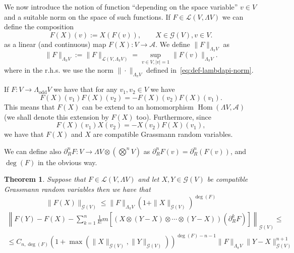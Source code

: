 \documentclass[11pt]{article}
\newcommand{\assign}{:=}
\newcommand{\tmop}[1]{\ensuremath{\operatorname{#1}}}
\newtheorem{theorem}{Theorem}
\begin{document}
We now introduce the notion of function ``depending on the space variable'' $v
\in V$ and a suitable norm on the space of such functions. If $F \in
\mathcal{L} (V, \Lambda V)$ we can define the composition
\[ F (X) (v) \assign X (F (v)), \qquad X \in \mathcal{G} (V), v \in V. \]
as a linear (and continuous) map $F (X) : V \rightarrow \mathcal{A}$. We
define $\| F \|_{\Lambda_{\pi} V\mathcal{}}$ as
\begin{equation}
  \| F \|_{\Lambda_{\pi} V\mathcal{}} \assign \| F \|_{\mathcal{L} (V,
  \Lambda_{\pi} V)} = \sup_{v \in V, | v | = 1} \| F (v) \|_{\Lambda_{\pi} V}
  . \label{eq:normfunction}
\end{equation}
where in the r.h.s. we use the norm $\| \cdot \|_{\Lambda_{\pi} V}$ defined
in~{\eqref{eq:def-lambdapi-norm}}.

\begin{remark}
  If $F : V \rightarrow \Lambda_{\tmop{odd}} V$ we have that for any $v_1, v_2
  \in V$ we have
  \[ F (X) (v_1) F (X) (v_2) = - F (X) (v_2) F (X) (v_1) . \]
  This means that $F (X)$ can be extend to an homomorphism $\tmop{Hom}
  (\Lambda V, \mathcal{A})$ (we shall denote this extension by $F (X)$ too).
  Furthermore, since
  \[ F (X) (v_1) X (v_2) = - X (v_2) F (X) (v_1), \]
  we have that $F (X)$ and $X$ are compatible Grassmann random variables.
\end{remark}

We can define also $\partial_R^n F : V \rightarrow \Lambda V \otimes \left(
\bigotimes^n V \right)$ as $\partial_R^n F (v) = \partial^n_R (F (v))$, and
$\deg (F)$ in the obvious way.

\begin{theorem}
  \label{theorem_function2}Suppose that $F \in \mathcal{L} (V, \Lambda V)$ and
  let $X, Y \in \mathcal{G} (V)$ be compatible Grassmann random variables then
  we have that
  \[ \| F (X) \|_{\mathcal{G} (V)} \leqslant \| F \|_{\Lambda_{\pi} V} (1 +
     \| X \|_{\mathcal{G} (V)})^{\deg (F)} \]
  \[ \begin{array}{c}
       \left\| F (Y) - F (X) - \sum_{k = 1}^n \frac{1}{k!} m [(X \otimes (Y -
       X) \otimes \cdots \otimes (Y - X)) (\partial_R^k F)]
       \right\|_{\mathcal{G} (V)} \leqslant\\
       \leqslant C_{n, \deg (F)} (1 + \max (\| X \|_{\mathcal{G} (V)}, \| Y
       \|_{\mathcal{G} (V)}))^{\deg (F) - n - 1} \| F \|_{\Lambda_{\pi} V} \|
       Y - X \|_{\mathcal{G} (V)}^{n + 1}
     \end{array} \]
\end{theorem}
\end{document}
